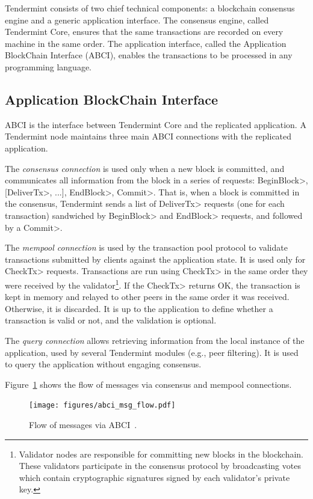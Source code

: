 %

Tendermint consists of two chief technical components: a blockchain consensus engine and a
generic application interface.
%
The consensus engine, called Tendermint Core, ensures that the same transactions are recorded
on every machine in the same order.
%
The application interface, called the Application BlockChain Interface (ABCI), enables the
transactions to be processed in any programming language.
%

\subsection{Application BlockChain Interface}
ABCI is the interface between Tendermint Core
and the replicated application.
%
A Tendermint node maintains three main ABCI connections with the replicated application.
%

The \textit{consensus connection} is used only when a new block is committed,
and communicates all information from the block in a series of 
requests: \<BeginBlock>, [\<DeliverTx>, ...], \<EndBlock>, \<Commit>.
%
That is, when a block is committed in the consensus, Tendermint sends a 
list of \<DeliverTx> requests (one for each transaction) sandwiched by 
\<BeginBlock> and \<EndBlock> requests, and followed by a \<Commit>.

%

The \textit{mempool connection} is used by the transaction
pool protocol to validate transactions submitted
by clients against the application state. 
%
It is used only for \<CheckTx> requests. Transactions
are run using \<CheckTx> in the same order they were received
by the validator\footnote{Validator nodes are responsible for committing new blocks in the blockchain. These validators participate in the consensus protocol by broadcasting votes which contain cryptographic signatures signed by each validator's private key.}. If the \<CheckTx> returns OK, the transaction
is kept in memory and relayed to other peers in the same order
it was received. Otherwise, it is discarded.
%
It is up to the application to define whether a transaction is valid or not, and
the validation is optional. 

%

The \textit{query connection} allows retrieving information
from the local instance of the application, used by several
Tendermint modules (e.g., peer filtering).
%
It is used to query the application without engaging consensus. 

Figure~\ref{fig:abci_flow} shows the flow of messages via consensus and mempool connections.
%

\begin{figure}
  \centering
  \texttt{[image: figures/abci\_msg\_flow.pdf]}
  \caption{Flow of messages via ABCI~\cite{tendermint.site}.}
  \label{fig:abci_flow}
\end{figure}

